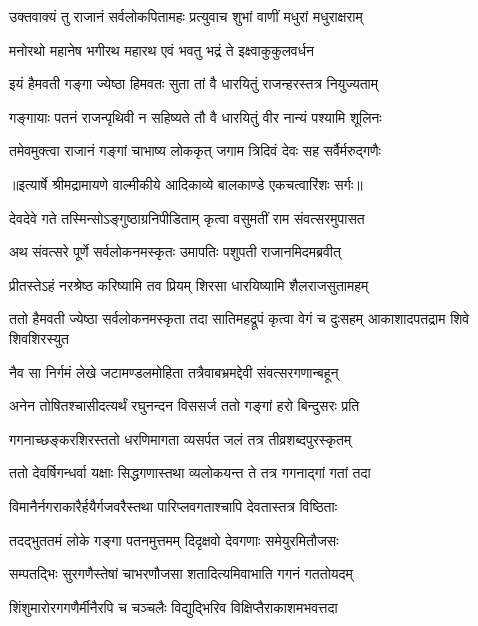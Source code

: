 \twolineshloka
{उक्तवाक्यं तु राजानं सर्वलोकपितामहः}
{प्रत्युवाच शुभां वाणीं मधुरां मधुराक्षराम्} %

\twolineshloka
{मनोरथो महानेष भगीरथ महारथ}
{एवं भवतु भद्रं ते इक्ष्वाकुकुलवर्धन} %

\twolineshloka
{इयं हैमवती गङ्गा ज्येष्ठा हिमवतः सुता}
{तां वै धारयितुं राजन्हरस्तत्र नियुज्यताम्} %

\twolineshloka
{गङ्गायाः पतनं राजन्पृथिवी न सहिष्यते}
{तौ वै धारयितुं वीर नान्यं पश्यामि शूलिनः} %

\twolineshloka
{तमेवमुक्त्वा राजानं गङ्गां चाभाष्य लोककृत्}
{जगाम त्रिदिवं देवः सह सर्वैर्मरुद्गणैः} %


{॥इत्यार्षे श्रीमद्रामायणे वाल्मीकीये आदिकाव्ये बालकाण्डे एकचत्वारिंशः सर्गः॥}


\twolineshloka
{देवदेवे गते तस्मिन्सोऽङ्गुष्ठाग्रनिपीडिताम्}
{कृत्वा वसुमतीं राम संवत्सरमुपासत} %

\twolineshloka
{अथ संवत्सरे पूर्णे सर्वलोकनमस्कृतः}
{उमापतिः पशुपती राजानमिदमब्रवीत्} %

\twolineshloka
{प्रीतस्तेऽहं नरश्रेष्ठ करिष्यामि तव प्रियम्}
{शिरसा धारयिष्यामि शैलराजसुतामहम्} %

\threelineshloka
{ततो हैमवती ज्येष्ठा सर्वलोकनमस्कृता}
{तदा सातिमहद्रूपं कृत्वा वेगं च दुःसहम्}
{आकाशादपतद्राम शिवे शिवशिरस्युत} %

\twolineshloka
{नैव सा निर्गमं लेखे जटामण्डलमोहिता}
{तत्रैवाबभ्रमद्देवी संवत्सरगणान्बहून्} %

\twolineshloka
{अनेन तोषितश्चासीदत्यर्थं रघुनन्दन}
{विससर्ज ततो गङ्गां हरो बिन्दुसरः प्रति} %

\twolineshloka
{गगनाच्छङ्करशिरस्ततो धरणिमागता}
{व्यसर्पत जलं तत्र तीव्रशब्दपुरस्कृतम्} %

\twolineshloka
{ततो देवर्षिगन्धर्वा यक्षाः सिद्धगणास्तथा}
{व्यलोकयन्त ते तत्र गगनाद्गां गतां तदा} %

\twolineshloka
{विमानैर्नगराकारैर्हयैर्गजवरैस्तथा}
{पारिप्लवगताश्चापि देवतास्तत्र विष्ठिताः} %

\twolineshloka
{तदद्भुततमं लोके गङ्गा पतनमुत्तमम्}
{दिदृक्षवो देवगणाः समेयुरमितौजसः} %

\twolineshloka
{सम्पतद्भिः सुरगणैस्तेषां चाभरणौजसा}
{शतादित्यमिवाभाति गगनं गततोयदम्} %

\twolineshloka
{शिंशुमारोरगगणैर्मीनैरपि च चञ्चलैः}
{विद्युद्भिरिव विक्षिप्तैराकाशमभवत्तदा} %

